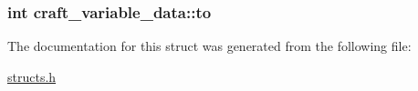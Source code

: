 \hypertarget{structcraft__variable__data_a15587e434f5e1f620962ec72df09e4df}{
\subsubsection[{to}]{\setlength{\rightskip}{0pt plus 5cm}int craft\-\_\-variable\-\_\-data\-::to}}\label{structcraft__variable__data_a15587e434f5e1f620962ec72df09e4df}


The documentation for this struct was generated from the following file\-:\begin{DoxyCompactItemize}
\item 
\hyperlink{structs_8h}{structs.\-h}\end{DoxyCompactItemize}
